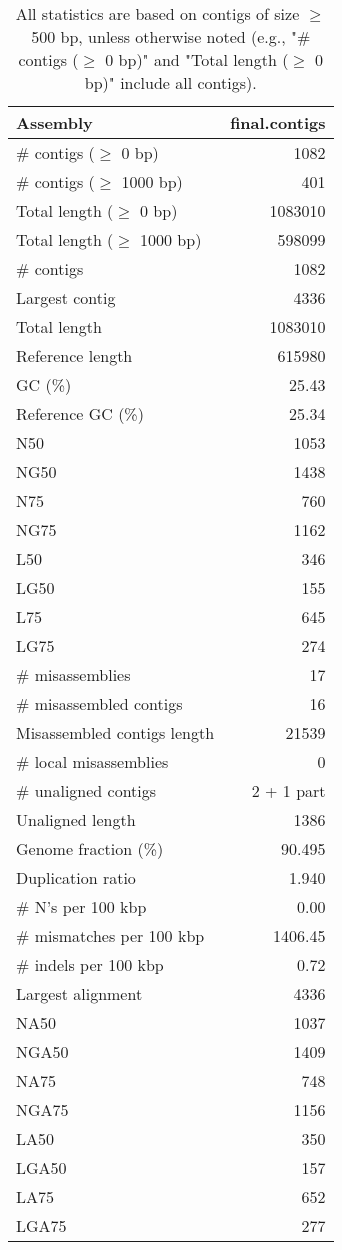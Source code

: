 \documentclass[12pt,a4paper]{article}
\begin{document}
\begin{table}[ht]
\begin{center}
\caption{All statistics are based on contigs of size $\geq$ 500 bp, unless otherwise noted (e.g., "\# contigs ($\geq$ 0 bp)" and "Total length ($\geq$ 0 bp)" include all contigs).}
\begin{tabular}{|l*{1}{|r}|}
\hline
Assembly & final.contigs \\ \hline
\# contigs ($\geq$ 0 bp) & 1082 \\ \hline
\# contigs ($\geq$ 1000 bp) & 401 \\ \hline
Total length ($\geq$ 0 bp) & 1083010 \\ \hline
Total length ($\geq$ 1000 bp) & 598099 \\ \hline
\# contigs & 1082 \\ \hline
Largest contig & 4336 \\ \hline
Total length & 1083010 \\ \hline
Reference length & 615980 \\ \hline
GC (\%) & 25.43 \\ \hline
Reference GC (\%) & 25.34 \\ \hline
N50 & 1053 \\ \hline
NG50 & 1438 \\ \hline
N75 & 760 \\ \hline
NG75 & 1162 \\ \hline
L50 & 346 \\ \hline
LG50 & 155 \\ \hline
L75 & 645 \\ \hline
LG75 & 274 \\ \hline
\# misassemblies & 17 \\ \hline
\# misassembled contigs & 16 \\ \hline
Misassembled contigs length & 21539 \\ \hline
\# local misassemblies & 0 \\ \hline
\# unaligned contigs & 2 + 1 part \\ \hline
Unaligned length & 1386 \\ \hline
Genome fraction (\%) & 90.495 \\ \hline
Duplication ratio & 1.940 \\ \hline
\# N's per 100 kbp & 0.00 \\ \hline
\# mismatches per 100 kbp & 1406.45 \\ \hline
\# indels per 100 kbp & 0.72 \\ \hline
Largest alignment & 4336 \\ \hline
NA50 & 1037 \\ \hline
NGA50 & 1409 \\ \hline
NA75 & 748 \\ \hline
NGA75 & 1156 \\ \hline
LA50 & 350 \\ \hline
LGA50 & 157 \\ \hline
LA75 & 652 \\ \hline
LGA75 & 277 \\ \hline
\end{tabular}
\end{center}
\end{table}
\end{document}
